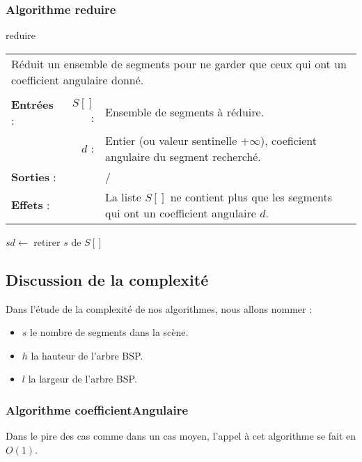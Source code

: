 \documentclass[10pt]{article}
\begin{document}
\subsubsection{Algorithme reduire}
\begin{algorithm}[H]
\caption{reduire}
\begin{tabular}{lrl}
\multicolumn{3}{l}{Réduit un ensemble de segments pour ne garder que ceux qui ont un coefficient angulaire donné.}\\
&&\\
\textbf{Entrées} : &$S[]$ : &Ensemble de segments à réduire.\\
& $d$ : &Entier (ou valeur sentinelle $+\infty$), coeficient angulaire du segment recherché.\\
\textbf{Sorties} :& &/\\
\textbf{Effets} :& &La liste $S[]$ ne contient plus que les segments qui ont un coefficient angulaire $d$.
\end{tabular}
\begin{algorithmic}[1]
\State $sd\gets$
\State retirer $s$ de $S[]$
\EndIf
\EndFor
\EndProcedure
\end{algorithmic}
\end{algorithm}

\newpage
\subsection{Discussion de la complexité}
Dans l'étude de la complexité de nos algorithmes, nous allons nommer :
\begin{itemize}
\item $s$ le nombre de segments dans la scène.
\item $h$ la hauteur de l'arbre BSP.
\item $l$ la largeur de l'arbre BSP.
\end{itemize}
\subsubsection{Algorithme coefficientAngulaire}
Dans le pire des cas comme dans un cas moyen, l'appel à cet algorithme se fait en $O(1)$.
\end{document}
